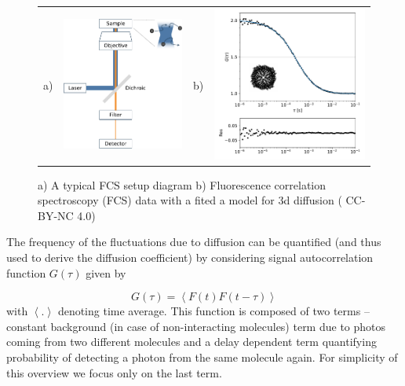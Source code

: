 \documentclass{doctoral}
\begin{document}
\begin{figure}[h]
    \centering
    \begin{tabular}{llll}
        a)                                                                           &
        \includegraphics[height=0.4\linewidth,valign=t]{figures/fcs_setup_clean.pdf} &
        b)                                                                           &
        \includegraphics[height=0.4\linewidth,valign=t,trim=0 0 0 0.5cm]{figures/fcs_data_and_fit.pdf}
    \end{tabular}

    \caption{a) A typical FCS setup diagram  b) Fluorescence correlation spectroscopy (FCS) data with a fited a model for 3d diffusion (\textcite{Waszkiewicz_2024_mda}
        CC-BY-NC 4.0)} \label{fig:fcs_diagram}
\end{figure}

The frequency of the fluctuations due to diffusion can be quantified (and thus used to derive the diffusion coefficient) by considering signal autocorrelation function $G(\tau)$ given by 

\begin{equation}
    G(\tau) = \left< F(t) F(t-\tau) \right>
\end{equation}
with $\left< .
    \right>$ denoting time average.
This function is composed of two terms -- constant background (in case of non-interacting molecules) term due to photos coming from two different molecules and a delay dependent term quantifying probability of detecting a photon from the same molecule again.
For simplicity of this overview we focus only on the last term.
\end{document}
